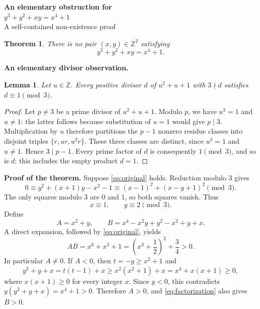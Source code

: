 \documentclass[11pt,a4paper]{article}
\newtheorem*{theorem}{Theorem}
\newtheorem*{lemma}{Lemma}
\begin{document}
\begin{center}
  {\Large\bfseries An elementary obstruction for}\\[5pt]
  {\Large $y^3+y^2+xy=x^4+1$}\\[7pt]
  {\small A self-contained non-existence proof}
\end{center}
\vspace{2pt}

\begin{theorem}
There is no pair $(x,y)\in\mathbb Z^2$ satisfying
\begin{equation}\label{eq:original}
 y^3+y^2+xy=x^4+1.
\end{equation}
\end{theorem}

\textbf{An elementary divisor observation.}
\begin{lemma}\label{lem:divisors}
Let $u\in\mathbb Z$. Every positive divisor $d$ of $u^2+u+1$ with
$3\nmid d$ satisfies $d\equiv1\pmod3$.
\end{lemma}
\begin{proof}
Let $p\ne3$ be a prime divisor of $u^2+u+1$. Modulo $p$, we have
$u^3=1$ and $u\ne1$: the latter follows because substitution of $u=1$
would give $p\mid3$. Multiplication by $u$ therefore partitions the
$p-1$ nonzero residue classes into disjoint triples
$\{r,ur,u^2r\}$. These three classes are distinct, since $u^3=1$ and
$u\ne1$. Hence $3\mid p-1$. Every prime factor of $d$ is consequently
$1\pmod3$, and so is $d$; this includes the empty product $d=1$.
\end{proof}

\textbf{Proof of the theorem.}
Suppose \eqref{eq:original} holds. Reduction modulo $3$ gives
\[
 0\equiv y^2+(x+1)y-x^2-1
   \equiv (x-1)^2+(x-y+1)^2\pmod3.
\]
The only squares modulo $3$ are $0$ and $1$, so both squares vanish. Thus
\begin{equation}\label{eq:residues}
 x\equiv1,\qquad y\equiv2\pmod3.
\end{equation}
Define
\[
 A=x^2+y,\qquad
 B=x^4-x^2y+y^2-x^2+y+x.
\]
A direct expansion, followed by \eqref{eq:original}, yields
\begin{equation}\label{eq:factorization}
 AB=x^6+x^3+1
   =\left(x^3+\frac12\right)^2+\frac34>0.
\end{equation}
In particular $A\ne0$. If $A<0$, then $t=-y\ge x^2+1$ and
\[
 y^2+y+x=t(t-1)+x
   \ge x^2(x^2+1)+x=x^4+x(x+1)\ge0,
\]
where $x(x+1)\ge0$ for every integer $x$. Since $y<0$, this contradicts
$y(y^2+y+x)=x^4+1>0$. Therefore $A>0$, and \eqref{eq:factorization}
also gives $B>0$.
\end{document}
